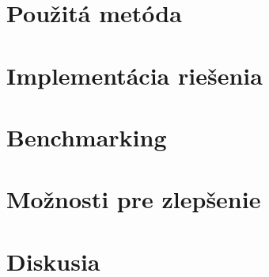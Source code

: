 \section{Použitá metóda}
\section{Implementácia riešenia}
\section{Benchmarking}
\section{Možnosti pre zlepšenie}
\section{Diskusia}
